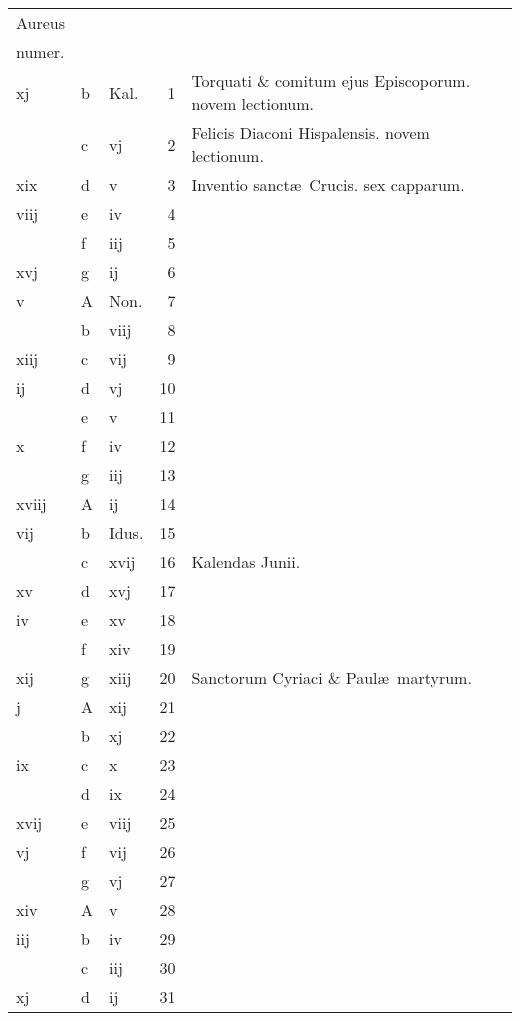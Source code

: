 \documentclass[letter,11pt]{book}
\begin{document}
\begin{center}
\begin{tabular}{l | l | l | r | l}
\color{Red}Aureus & & & \\
\color{Red}numer. & & & \\
\color{Red} xj & b & \color{Red} Kal. & 1 & Torquati \& comitum ejus Episcoporum. \color{Red} novem lectionum. \\
\color{Red}  & c & \color{Red} vj & 2 & Felicis Diaconi Hispalensis. \color{Red} novem lectionum. \\
\color{Red} xix & d & \color{Red} v & 3 & Inventio sanct\ae \ Crucis. \color{Red} sex capparum. \\
\color{Red} viij & e & \color{Red} iv & 4 & \\
\color{Red}  & f & \color{Red} iij & 5 & \\
\color{Red} xvj & g & \color{Red} ij & 6 & \\
\color{Red} v & \color{Red} A & Non. & 7 & \\
\color{Red}  & b & \color{Red} viij & 8 & \\
\color{Red} xiij & c & \color{Red} vij & 9 & \\
\color{Red} ij & d & \color{Red} vj & 10 & \\
\color{Red}  & e & \color{Red} v & 11 & \\
\color{Red} x & f & \color{Red} iv & 12 & \\
\color{Red}  & g & \color{Red} iij & 13 & \\
\color{Red} xviij & \color{Red} A & \color{Red} ij & 14 & \\
\color{Red} vij & b & Idus. & 15 & \\
\color{Red}  & c & \color{Red} xvij & 16 & \qquad \color{Red} Kalendas Junii. \\
\color{Red} xv & d & \color{Red} xvj & 17 & \\
\color{Red} iv & e & \color{Red} xv & 18 & \\
\color{Red}  & f & \color{Red} xiv & 19 & \\
\color{Red} xij & g & \color{Red} xiij & 20 & Sanctorum Cyriaci \& Paul\ae \ martyrum. \\
\color{Red} j & \color{Red} A & \color{Red} xij & 21 & \\
\color{Red}  & b & \color{Red} xj & 22 & \\
\color{Red} ix & c & \color{Red} x & 23 & \\
\color{Red}  & d & \color{Red} ix & 24 & \\
\color{Red} xvij & e & \color{Red} viij & 25 & \\
\color{Red} vj & f & \color{Red} vij & 26 & \\
\color{Red}  & g & \color{Red} vj & 27 & \\
\color{Red} xiv & \color{Red} A & \color{Red} v & 28 & \\
\color{Red} iij & b & \color{Red} iv & 29 & \\
\color{Red}  & c & \color{Red} iij & 30 & \\
\color{Red} xj & d & \color{Red} ij & 31 & \\
\end{tabular}
\end{center}
\end{document}
